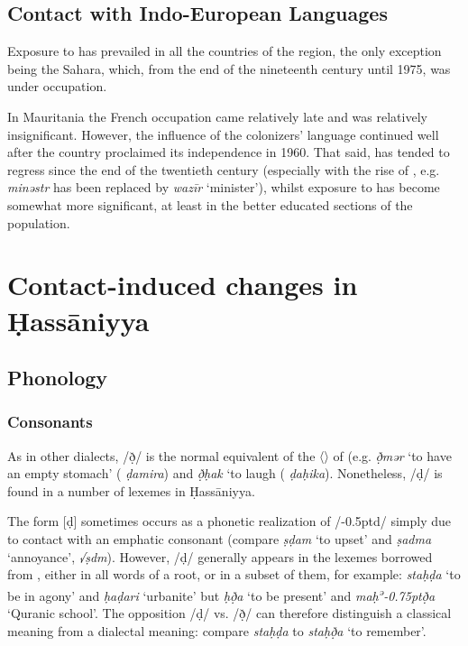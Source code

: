 \documentclass[output=paper]{langsci/langscibook}
\begin{document}
\subsection{Contact with Indo-European Languages} %

Exposure to  has prevailed in all the countries of the region, the only exception being the  Sahara, which, from the end of the nineteenth century until 1975, was under  occupation.

In Mauritania the French occupation came relatively late and was relatively insignificant. However, the influence of the colonizers’ language continued well after the country proclaimed its independence in 1960. That said,  has tended to regress since the end of the twentieth century (especially with the rise of  , e.g. \textit{minəstr} has been replaced by \textit{wazīr} ‘minister’), whilst exposure to  has become somewhat more significant, at least in the better educated sections of the population.

\section{Contact-induced changes in Ḥassāniyya} %

\subsection{Phonology} %

\subsubsection{Consonants} %
As in other  dialects, /ð̣/ is the normal equivalent of the 〈〉 of   (e.g. \textit{ð̣mər} ‘to have an empty stomach’ ( \textit{ḍamira}) and \textit{ð̣ḥak} ‘to laugh ( \textit{ḍaḥika}). Nonetheless, /ḍ/ is found in a number of lexemes in Ḥassāniyya. 

The form [ḍ] sometimes occurs as a phonetic realization of /\kern -0.5ptd/ simply due to contact with an {emphatic consonant} (compare \textit{ṣḍam} ‘to upset’ and \textit{ṣadma} ‘annoyance’,  \textit{√ṣdm}). However, /ḍ/ generally appears in the lexemes borrowed from  , either in all words of a {root}, or in a subset of them, for example: \textit{staḥḍa{\R}} ‘to be in agony’ and \textit{ḥaḍari} ‘urbanite’ but \textit{ḥð̣a{\R}} ‘to be present’ and \textit{maḥ\textsuperscript{ə}\kern -0.75ptð̣{\R}a} ‘Quranic school’. The opposition /ḍ/ vs. /ð̣/ can therefore distinguish a classical meaning from a dialectal meaning: compare \textit{staḥḍa{\R}} to \textit{staḥð̣a{\R}} ‘to remember’.
\end{document}
